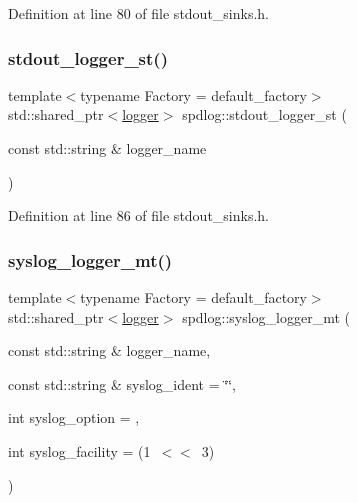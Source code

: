 Definition at line 80 of file stdout\+\_\+sinks.\+h.

\mbox{\label{namespacespdlog_a5b0d86b010b11ceb3941265779c7998e}} 
\subsubsection{\texorpdfstring{stdout\+\_\+logger\+\_\+st()}{stdout\_logger\_st()}}
{\footnotesize\ttfamily template$<$typename Factory  = default\+\_\+factory$>$ \\
std\+::shared\+\_\+ptr$<$\hyperlink{classspdlog_1_1logger}{logger}$>$ spdlog\+::stdout\+\_\+logger\+\_\+st (\begin{DoxyParamCaption}\item[{const std\+::string \&}]{logger\+\_\+name }\end{DoxyParamCaption})\hspace{0.3cm}{\ttfamily [inline]}}



Definition at line 86 of file stdout\+\_\+sinks.\+h.

\mbox{\label{namespacespdlog_a49974c7465d12f994929f70c0caeeb7c}} 
\subsubsection{\texorpdfstring{syslog\+\_\+logger\+\_\+mt()}{syslog\_logger\_mt()}}
{\footnotesize\ttfamily template$<$typename Factory  = default\+\_\+factory$>$ \\
std\+::shared\+\_\+ptr$<$\hyperlink{classspdlog_1_1logger}{logger}$>$ spdlog\+::syslog\+\_\+logger\+\_\+mt (\begin{DoxyParamCaption}\item[{const std\+::string \&}]{logger\+\_\+name,  }\item[{const std\+::string \&}]{syslog\+\_\+ident = {\ttfamily \char`\"{}\char`\"{}},  }\item[{int}]{syslog\+\_\+option = {},  }\item[{int}]{syslog\+\_\+facility = {\ttfamily (1~$<$$<$~3)} }\end{DoxyParamCaption})\hspace{0.3cm}{\ttfamily [inline]}}



